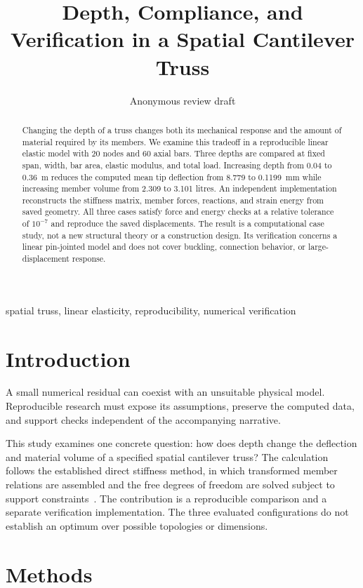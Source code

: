 \documentclass[conference]{IEEEtran}
\title{Depth, Compliance, and Verification in a Spatial Cantilever Truss}
\author{Anonymous review draft}
\begin{document}
\maketitle
\begin{abstract}
Changing the depth of a truss changes both its mechanical response and the amount of material required by its members. We examine this tradeoff in a reproducible linear elastic model with 20 nodes and 60 axial bars. Three depths are compared at fixed span, width, bar area, elastic modulus, and total load. Increasing depth from 0.04 to 0.36~m reduces the computed mean tip deflection from 8.779 to 0.1199~mm while increasing member volume from 2.309 to 3.101 litres. An independent implementation reconstructs the stiffness matrix, member forces, reactions, and strain energy from saved geometry. All three cases satisfy force and energy checks at a relative tolerance of $10^{-7}$ and reproduce the saved displacements. The result is a computational case study, not a new structural theory or a construction design. Its verification concerns a linear pin-jointed model and does not cover buckling, connection behavior, or large-displacement response.
\end{abstract}
\begin{IEEEkeywords}
spatial truss, linear elasticity, reproducibility, numerical verification
\end{IEEEkeywords}
\section{Introduction}
A small numerical residual can coexist with an unsuitable physical model. Reproducible research must expose its assumptions, preserve the computed data, and support checks independent of the accompanying narrative.

This study examines one concrete question: how does depth change the deflection and material volume of a specified spatial cantilever truss? The calculation follows the established direct stiffness method, in which transformed member relations are assembled and the free degrees of freedom are solved subject to support constraints~\cite{purdue}. The contribution is a reproducible comparison and a separate verification implementation. The three evaluated configurations do not establish an optimum over possible topologies or dimensions.

\section{Methods}
\end{document}
